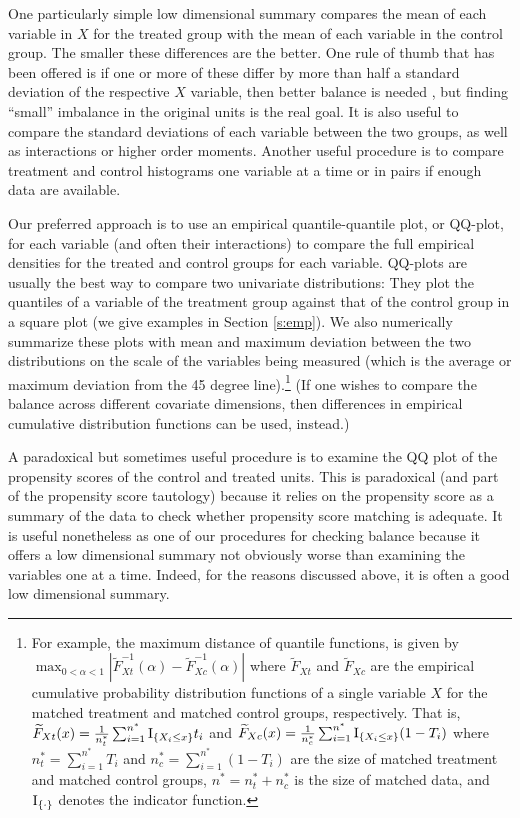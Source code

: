 \documentclass[11pt,titlepage]{article}
\begin{document}
One particularly simple low dimensional summary compares the mean of
each variable in $X$ for the treated group with the mean of each
variable in the control group.  The smaller these differences are the
better.  One rule of thumb that has been offered is if one or more of
these differ by more than half a standard deviation of the respective
$X$ variable, then better balance is needed \citep{Cochran68}, but
finding ``small'' imbalance in the original units is the real goal.
It is also useful to compare the standard deviations of each variable
between the two groups, as well as interactions or higher order
moments.  Another useful procedure is to compare treatment and control
histograms one variable at a time or in pairs if enough data are
available.

Our preferred approach is to use an empirical quantile-quantile plot,
or QQ-plot, for each variable (and often their interactions) to
compare the full empirical densities for the treated and control
groups for each variable.  QQ-plots are usually the best way to
compare two univariate distributions: They plot the quantiles of a
variable of the treatment group against that of the control group in a
square plot (we give examples in Section \ref{s:emp}).  We also
numerically summarize these plots with mean and maximum deviation
between the two distributions on the scale of the variables being
measured (which is the average or maximum deviation from the 45 degree
line).\footnote{For example, the maximum distance of quantile
  functions, is given by $\max_{0 < \alpha < 1}
  |\widetilde{F}_{Xt}^{-1}(\alpha)-\widetilde{F}^{-1}_{Xc}(\alpha)|$
  where $\widetilde{F}_{Xt}$ and $\widetilde{F}_{Xc}$ are the
  empirical cumulative probability distribution functions of a single
  variable $X$ for the matched treatment and matched control groups,
  respectively. That is, $\widetilde{F}_{Xt}(x)=\frac{1}{n^*_t}
  \sum_{i=1}^{n^*} {\rm I}_{\{X_i \le x\}} t_i$ and
  $\widetilde{F}_{Xc}(x)=\frac{1}{n^*_c} \sum_{i=1}^{n^*} {\rm
    I}_{\{X_i \le x\}} (1-T_i)$ where $n^*_t=\sum_{i=1}^{n^*} T_i$ and
  $n^*_c=\sum_{i=1}^{n^*} (1-T_i)$ are the size of matched treatment
  and matched control groups, $n^*=n^*_t + n^*_c$ is the size of
  matched data, and ${\rm I}_{\{\cdot\}}$ denotes the indicator
  function.} (If one wishes to compare the balance across different
covariate dimensions, then differences in empirical cumulative
distribution functions can be used, instead.)

A paradoxical but sometimes useful procedure is to examine the QQ plot
of the propensity scores of the control and treated units.  This is
paradoxical (and part of the propensity score tautology) because it
relies on the propensity score as a summary of the data to check
whether propensity score matching is adequate.  It is useful
nonetheless as one of our procedures for checking balance because it
offers a low dimensional summary not obviously worse than 
examining the variables one at a time.  Indeed, for the reasons discussed
above, it is often a good low dimensional summary.
\end{document}
